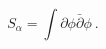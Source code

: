 \begin{equation}
S_{\alpha}=\int\partial\phi\bar{\partial}\phi \ .
\label{ea;alpha}
\end{equation}

